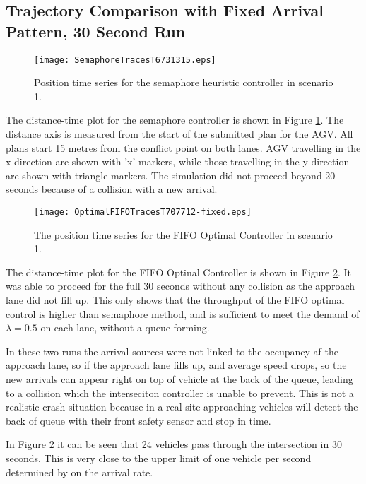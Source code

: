 \subsection{Trajectory Comparison with Fixed Arrival Pattern, 30 Second Run}
\label{sec:fixed_arrival_pattern}
\begin{figure}
	\texttt{[image: SemaphoreTracesT6731315.eps]}
	\caption{Position time series for the semaphore heuristic controller in scenario 1.}
	\label{fig:semaphore_st}       %
\end{figure}
The distance-time plot for the semaphore controller is shown in Figure \ref{fig:semaphore_st}. The distance axis is measured from the start of the submitted plan for the AGV. All plans start 15 metres from the conflict point on both lanes. AGV travelling in the x-direction are shown with 'x' markers, while those travelling in the y-direction are shown with triangle markers. The simulation did not proceed beyond 20 seconds because of a collision with a new arrival. 

\begin{figure}
	\texttt{[image: OptimalFIFOTracesT707712-fixed.eps]}
	\caption{The position time series for the FIFO Optimal Controller in scenario 1.}
	\label{fig:optimal_fifo_st}       %
\end{figure}
The distance-time plot for the FIFO Optinal Controller is shown in Figure \ref{fig:optimal_fifo_st}. It was able to proceed for the full 30 seconds without any collision as the approach lane did not fill up. This only shows that the throughput of the FIFO optimal control is higher than semaphore method, and is sufficient to meet the demand of $\lambda=0.5$ on each lane, without a queue forming.   

In these two runs the arrival sources were not linked to the occupancy af the approach lane, so if the approach lane fills up, and average speed drops, so the new arrivals can appear right on top of vehicle at the back of the queue, leading to a collision which the interseciton controller is unable to prevent.  This is not a realistic crash situation because in a real site approaching vehicles will detect the back of queue with their front safety sensor and stop in time. 

In Figure \ref{fig:optimal_fifo_st} it can be seen that 24 vehicles pass through the intersection in 30 seconds. This is very close to the upper limit of one vehicle per second determined by on the arrival rate. 

